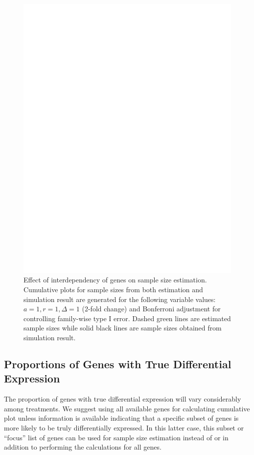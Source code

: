 \documentclass[12pt]{article}
\begin{document}
\begin{figure}%
  \caption[Effect of interdependency of genes on sample size
    estimation] {Effect of interdependency of genes on sample size
    estimation.  Cumulative plots for sample sizes from both
    estimation and simulation result are generated for the following
    variable values: $a = 1, r = 1, \Delta = 1$ (2-fold change) and
    Bonferroni adjustment for controlling family-wise type I
    error. Dashed green lines are estimated sample sizes while solid
    black lines are sample sizes obtained from simulation result.}
  \label{fig:ResDep}
  \centerline{\includegraphics*[width=\textwidth]{ResDepF.pdf}} 
\end{figure}

\subsection{Proportions of Genes with True Differential Expression}

The proportion of genes with true differential expression will vary
considerably among treatments. We suggest using all available genes
for calculating cumulative plot unless information is available
indicating that a specific subset of genes is more likely to be
truly differentially expressed. In this latter case, this subset or
``focus'' list of genes can be used for sample size estimation
instead of or in addition to performing the calculations for all
genes.
\end{document}
